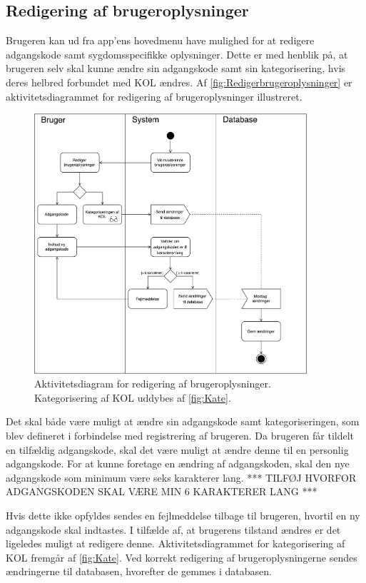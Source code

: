 \subsection*{Redigering af brugeroplysninger} \label{sec:redigrering}
Brugeren kan ud fra app'ens hovedmenu have mulighed for at redigere adgangskode samt sygdomsspecifikke oplysninger. Dette er med henblik på, at brugeren selv skal kunne ændre sin adgangskode samt sin kategorisering, hvis deres helbred forbundet med KOL ændres. Af \autoref{fig:Redigerbrugeroplysninger} er aktivitetsdiagrammet for redigering af brugeroplysninger illustreret. 

\begin{figure} [H]
\centering
\includegraphics[width=0.9\textwidth]{figures/aktivitetsdiagram/Redigerbrugeroplysninger}
\caption{Aktivitetsdiagram for redigering af brugeroplysninger. Kategorisering af KOL uddybes af \autoref{fig:Kate}.}
\label{fig:Redigerbrugeroplysninger}
\end{figure}

\noindent
Det skal både være muligt at ændre sin adgangskode samt kategoriseringen, som blev defineret i forbindelse med registrering af brugeren. Da brugeren får tildelt en tilfældig adgangskode, skal det være muligt at ændre denne til en personlig adgangskode. For at kunne foretage en ændring af adgangskoden, skal den nye adgangskode som minimum være seks karakterer lang. *** TILFØJ HVORFOR ADGANGSKODEN SKAL VÆRE MIN 6 KARAKTERER LANG ***

Hvis dette ikke opfyldes sendes en fejlmeddelse tilbage til brugeren, hvortil en ny adgangskode skal indtastes. 
I tilfælde af, at brugerens tilstand ændres er det ligeledes muligt at redigere denne. Aktivitetsdiagrammet for kategorisering af KOL fremgår af \autoref{fig:Kate}.
Ved korrekt redigering af brugeroplysningerne sendes ændringerne til databasen, hvorefter de gemmes i databasen.